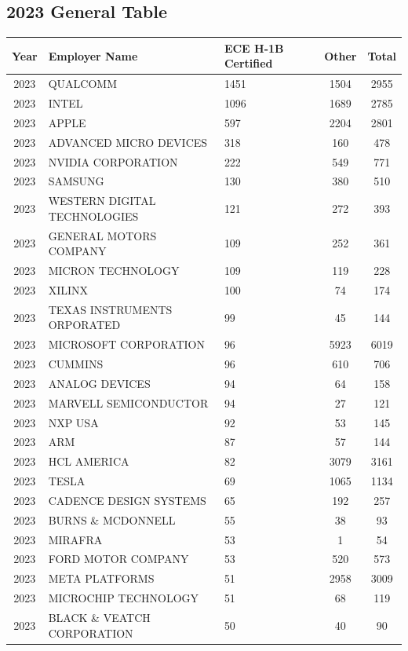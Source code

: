 \documentclass{article}%
\begin{document}
\subsection{2023 General Table}%
\label{subsec:2023GeneralTable}%
\begin{longtable}{c|p{20em}|p{5em}|c|c}%
\hline%
Year&Employer Name&ECE \newline%
 H{-}1B \newline%
 Certified&Other&Total\\%
\hline%
2023&QUALCOMM&1451&1504&2955\\%
\hline%
2023&INTEL&1096&1689&2785\\%
\hline%
2023&APPLE&597&2204&2801\\%
\hline%
2023&ADVANCED MICRO DEVICES&318&160&478\\%
\hline%
2023&NVIDIA CORPORATION&222&549&771\\%
\hline%
2023&SAMSUNG&130&380&510\\%
\hline%
2023&WESTERN DIGITAL TECHNOLOGIES&121&272&393\\%
\hline%
2023&GENERAL MOTORS COMPANY&109&252&361\\%
\hline%
2023&MICRON TECHNOLOGY&109&119&228\\%
\hline%
2023&XILINX&100&74&174\\%
\hline%
2023&TEXAS INSTRUMENTS ORPORATED&99&45&144\\%
\hline%
2023&MICROSOFT CORPORATION&96&5923&6019\\%
\hline%
2023&CUMMINS&96&610&706\\%
\hline%
2023&ANALOG DEVICES&94&64&158\\%
\hline%
2023&MARVELL SEMICONDUCTOR&94&27&121\\%
\hline%
2023&NXP USA&92&53&145\\%
\hline%
2023&ARM&87&57&144\\%
\hline%
2023&HCL AMERICA&82&3079&3161\\%
\hline%
2023&TESLA&69&1065&1134\\%
\hline%
2023&CADENCE DESIGN SYSTEMS&65&192&257\\%
\hline%
2023&BURNS \& MCDONNELL&55&38&93\\%
\hline%
2023&MIRAFRA&53&1&54\\%
\hline%
2023&FORD MOTOR COMPANY&53&520&573\\%
\hline%
2023&META PLATFORMS&51&2958&3009\\%
\hline%
2023&MICROCHIP TECHNOLOGY&51&68&119\\%
\hline%
2023&BLACK \& VEATCH CORPORATION&50&40&90\\%

\end{longtable}
\end{document}
